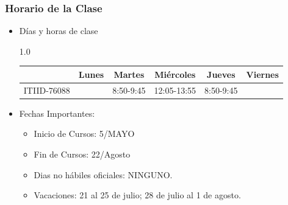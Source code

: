 \begin{frame}
\frametitle{Horario de la Clase}


\begin{itemize}
\item Días y horas de clase
\tiny
\begin{spacing}{1.0}
\begin{center}
\begin{tabular}{c|ccccc}
\hline 
          & Lunes        & Martes      & Miércoles   & Jueves        & Viernes      \\  \hline 
ITIID-76088 &              & 8:50-9:45   & 12:05-13:55 & 8:50-9:45 &   \\            
\hline
\end{tabular}
\end{center}
\end{spacing}
\normalsize
\item Fechas Importantes:
\begin{itemize}
\item Inicio de Cursos: 5/MAYO
\item Fin de Cursos: 22/Agosto
\item Dias no hábiles oficiales: NINGUNO.
\item Vacaciones: 21 al 25 de julio; 28 de julio al 1 de agosto.
\end{itemize}
\end{itemize}

\end{frame}



